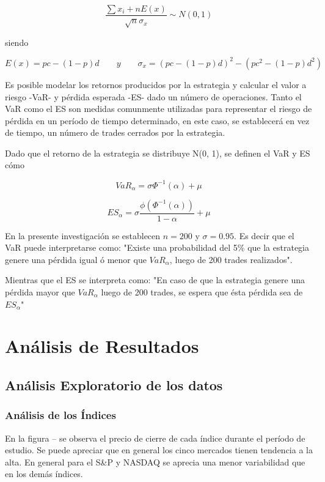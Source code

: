 \documentclass[a4paper,12pt]{Latex/Classes/PhDthesisPSnPDF}
\begin{document}
$$ \frac{\sum x_{i} + nE(x)}{\sqrt{n}\sigma_{x}} \sim N(0,1) $$

siendo

$$ E(x) = pc - (1-p)d \qquad y \qquad \sigma_{x} = (pc - (1-p)d)^{2} - (pc^{2} - (1-p)d^{2}) $$

Es posible modelar los retornos producidos por la estrategia y calcular el valor a riesgo -VaR- y pérdida esperada -ES- dado un número de operaciones. Tanto el VaR como el ES son medidas comunmente utilizadas para representar el riesgo de pérdida en un período de tiempo determinado, en este caso, se establecerá en vez de tiempo, un número de trades cerrados por la estrategia.

Dado que el retorno de la estrategia se distribuye N(0, 1), se definen el VaR y ES cómo

$$ VaR_{\alpha} = \sigma \Phi^{-1}(\alpha) + \mu $$

$$ ES_{\alpha} = \sigma \frac{\phi(\Phi^{-1}(\alpha))}{1-\alpha} + \mu $$

En la presente investigación se establecen $n = 200$ y $\sigma = 0.95$. Es decir que el VaR puede interpretarse como: "Existe una probabilidad del 5\% que la estrategia genere una pérdida igual ó menor que $VaR_{\alpha}$, luego de 200 trades realizados".

Mientras que el ES se interpreta como: "En caso de que la estrategia genere una pérdida mayor que $VaR_{\alpha}$ luego de 200 trades, se espera que ésta pérdida sea de $ES_{\alpha}$"

\chapter{Análisis de Resultados}

\section{Análisis Exploratorio de los datos}

\subsection{Análisis de los Índices}

En la figura -- se observa el precio de cierre de cada índice durante el período de estudio. Se puede apreciar que en general los cinco mercados tienen tendencia a la alta. En general para el S\&P y NASDAQ se aprecia una menor variabilidad que en los demás índices.
\end{document}
